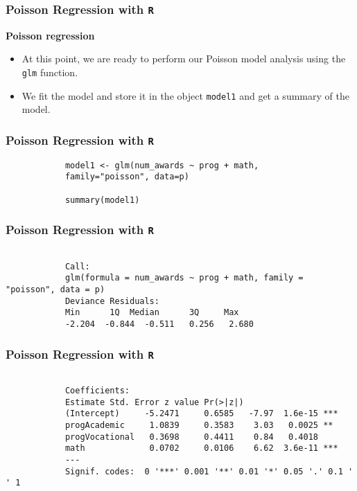 \documentclass[MASTER.tex]{subfiles}
\begin{document}
	
	\begin{frame}[fragile]
		
		\frametitle{Poisson Regression with \texttt{R}}
		\Large
		
		\textbf{Poisson regression}
		\begin{itemize}
			\item At this point, we are ready to perform our Poisson model analysis using the \texttt{glm} function. 
			\item We fit the model and store it in the object \texttt{model1} and get a summary of the model.
		\end{itemize}
	\end{frame}
	
	\begin{frame}[fragile]
		
		\frametitle{Poisson Regression with \texttt{R}}
		\large
		\begin{framed}
			\begin{verbatim}
			model1 <- glm(num_awards ~ prog + math, 
			family="poisson", data=p)
			
			summary(model1)
			\end{verbatim}
		\end{framed}
	\end{frame}
	\begin{frame}[fragile]
		\frametitle{Poisson Regression with \texttt{R}}
		\large
		\begin{framed}
			\begin{verbatim}
			
			Call:
			glm(formula = num_awards ~ prog + math, family = "poisson", data = p)
			Deviance Residuals: 
			Min      1Q  Median      3Q     Max  
			-2.204  -0.844  -0.511   0.256   2.680  
			\end{verbatim}
		\end{framed}
	\end{frame}
	
	\begin{frame}[fragile]
		
		\frametitle{Poisson Regression with \texttt{R}}
		\large
		\begin{framed}
			\begin{verbatim}
			
			Coefficients:
			Estimate Std. Error z value Pr(>|z|)    
			(Intercept)     -5.2471     0.6585   -7.97  1.6e-15 ***
			progAcademic     1.0839     0.3583    3.03   0.0025 ** 
			progVocational   0.3698     0.4411    0.84   0.4018    
			math             0.0702     0.0106    6.62  3.6e-11 ***
			---
			Signif. codes:  0 '***' 0.001 '**' 0.01 '*' 0.05 '.' 0.1 ' ' 1
			
			\end{verbatim}
		\end{framed}
	\end{frame}
	
\end{document}
